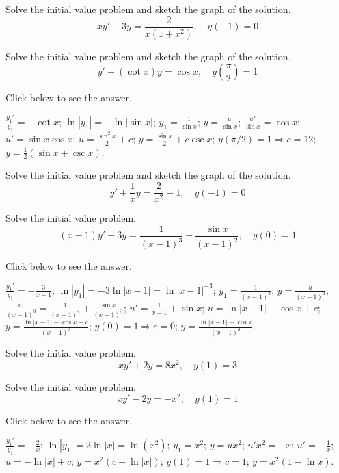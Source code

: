 \documentclass{ximera}
\begin{document}
\begin{problem}\label{exer:2.1.27} Solve the
initial value problem and sketch the graph of the solution.
$$xy'+3y=\frac{2}{x(1+x^2)},\quad y(-1)=0$$
\end{problem}

\begin{problem}\label{exer:2.1.28} Solve the
initial value problem and sketch the graph of the solution.
$$y'+ (\cot x)y=\cos x,\quad
y\left(\frac{\pi}{2}\right)=1$$

Click below to see the answer.

\begin{expandable}
    $\frac{y_1'}{ y_1}=-\cot x$;\quad
$\ln|y_1|=-\ln|\sin x|$;\quad
$y_1=\frac{1}{\sin x}$;\quad
$y=\frac{u}{\sin x}$;\quad
$\frac{u'}{\sin x}=\cos x$;\quad
$u'=\sin x\cos x$;\quad
$u=\frac{\sin^2x}{2}+c$;\quad
$y=\frac{\sin x}{2}+c\csc x$;\quad
$y(\pi/2)=1\Rightarrow c={1}{2}$;\quad
$y=\frac{1}{2}(\sin x+\csc x)$.
\end{expandable}
\end{problem}

\begin{problem}\label{exer:2.1.29} Solve the
initial value problem and sketch the graph of the solution.
$$y'+\frac{1}{x}y=\frac{2}{x^2}+1,\quad y(-1)=0$$
\end{problem}

\begin{problem}\label{exer:2.1.30} Solve the initial value problem.
$$(x-1)y'+3y=\frac{1}{(x-1)^3} +
\frac{\sin x}{(x-1)^2},\quad y(0)=1$$

Click below to see the answer.

\begin{expandable}
    $\frac{y_1'}{ y_1}=-\frac{3}{ x-1}$;\quad
$\ln|y_1|=-3\ln|x-1|
=\ln|x-1|^{-3}$;\quad
$y_1=\frac{1}{(x-1)^3}$;\quad
$y=\frac{u}{(x-1)^3}$;\quad
$\frac{u'}{(x-1)^3}=
\frac{1}{(x-1)^4}+\frac{\sin
x}{(x-1)^3}$;\quad
$u'=\frac{1}{ x-1}+\sin x$;\quad
$u=\ln|x-1|-\cos x+c$;\quad
$y=\frac{\ln|x-1|-\cos x+c}{(x-1)^3}$;\quad
$y(0)=1\Rightarrow c=0$;\quad
$y=\frac{\ln|x-1|-\cos x}{(x-1)^3}$.
\end{expandable}
\end{problem}

\begin{problem}\label{exer:2.1.31} Solve the initial value problem.
$$xy'+2y=8x^2,\quad y(1)=3$$
\end{problem}

\begin{problem}\label{exer:2.1.32} Solve the initial value problem.
$$xy'-2y=-x^2,\quad y(1)=1$$

Click below to see the answer.

\begin{expandable}
    $\frac{y_1'}{ y_1}=-\frac{2}{ x}$;\quad
$\ln|y_1|=2\ln|x|=\ln(x^2)$;\quad
$y_1=x^2$;\quad
$y=ux^2$;\quad
$u'x^2=-x$;\quad
$u'=-\frac{1}{ x}$;\quad
$u=-\ln|x|+c$;\quad
$y=x^2(c-\ln|x|)$;\quad
$y(1)=1\Rightarrow c=1$;\quad
$y=x^2(1-\ln x)$.
\end{expandable}
\end{problem}
\end{document}

